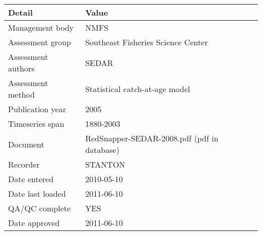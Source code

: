 \begin{table}[htb]
\centering
\begin{tabular}{lp{7cm}}
\toprule
Detail & Value \\
\midrule
Management body    & NMFS                                        \\
Assessment group   & Southeast Fisheries Science Center          \\
Assessment authors & SEDAR                                       \\
Assessment method  & Statistical catch-at-age model              \\
Publication year   & 2005                                        \\
Timeseries span    & 1880-2003                                   \\
Document           & RedSnapper-SEDAR-2008.pdf (pdf in database) \\
Recorder           & STANTON                                     \\
Date entered       & 2010-05-10                                  \\
Date last loaded   & 2011-06-10                                  \\
QA/QC complete     & YES                                         \\
Date approved      & 2011-06-10                                  \\
\bottomrule
\end{tabular}
\label{tab:assessdet}
\end{table}
